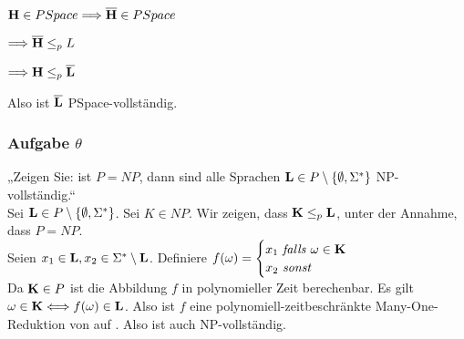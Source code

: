    \hspace{.52cm} $\textbf{H} \in PSpace \Longrightarrow \overline{\textbf{H}} \in PSpace$

    \hspace{2.55cm} $\Longrightarrow \overline{\textbf{H}} \leq_{p} L$

    \hspace{2.55cm} $\Longrightarrow \textbf{H} \leq_{p} \overline{\textbf{L}}$

    Also ist $\overline{\textbf{L}}$ PSpace-vollständig.


\subsubsection*{Aufgabe $\theta$}
    „Zeigen Sie: ist $P = NP$, dann sind alle Sprachen $\textbf{L} \in P\setminus\{\emptyset, \Sigma^{*}\}$ NP-vollständig.“ \\
    Sei $\textbf{L} \in P\setminus\{\emptyset, \Sigma^{*}\}$. Sei $K \in NP$. Wir zeigen, dass $\textbf{K} \leq_{p} \textbf{L}$, unter der Annahme, dass $P=NP$.\\

    Seien $x_{1} \in \textbf{L}, x_{2} \in \Sigma^{*}\setminus\textbf{L}$.
    Definiere $
        f(\omega) =
        \begin{cases}
            x_{1}\ \mathit{falls}\ \omega \in \textbf{K}\\
            x_{2}\ \mathit{sonst}
        \end{cases}
    $ \\

    Da $\textbf{K} \in P$ ist die Abbildung $f$ in polynomieller Zeit berechenbar. Es gilt $\omega \in \textbf{K} \Longleftrightarrow f(\omega) \in \textbf{L}$. Also ist $f$ eine polynomiell-zeitbeschränkte Many-One-Reduktion von  auf . Also ist  auch NP-vollständig.
